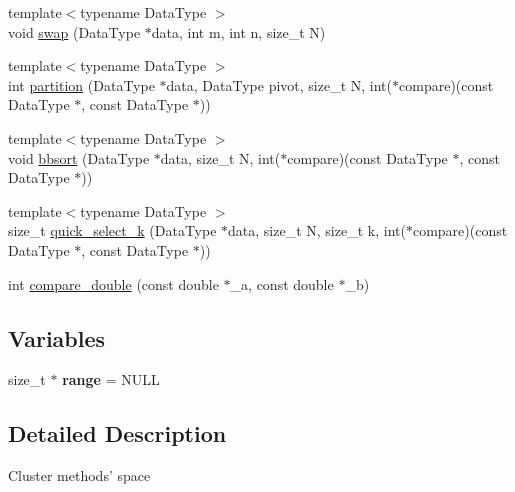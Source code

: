 \begin{DoxyCompactItemize}
\item 
{\footnotesize template$<$typename Data\-Type $>$ }\\void \hyperlink{namespaceSimpleCluster_aefa29bb93b88e6235d7a7c3be4181bf7}{swap} (Data\-Type $\ast$data, int m, int n, size\-\_\-t N)
\item 
{\footnotesize template$<$typename Data\-Type $>$ }\\int \hyperlink{namespaceSimpleCluster_adcef86d645170d3c6b1c7908866d755e}{partition} (Data\-Type $\ast$data, Data\-Type pivot, size\-\_\-t N, int($\ast$compare)(const Data\-Type $\ast$, const Data\-Type $\ast$))
\item 
{\footnotesize template$<$typename Data\-Type $>$ }\\void \hyperlink{namespaceSimpleCluster_acbdd21892a0a82f32c6d1851a7044f37}{bbsort} (Data\-Type $\ast$data, size\-\_\-t N, int($\ast$compare)(const Data\-Type $\ast$, const Data\-Type $\ast$))
\item 
{\footnotesize template$<$typename Data\-Type $>$ }\\size\-\_\-t \hyperlink{namespaceSimpleCluster_a3ff7d10652b776ae35a941228850d904}{quick\-\_\-select\-\_\-k} (Data\-Type $\ast$data, size\-\_\-t N, size\-\_\-t k, int($\ast$compare)(const Data\-Type $\ast$, const Data\-Type $\ast$))
\item 
int \hyperlink{namespaceSimpleCluster_a14624e6cca7beb136be3623222fb3acc}{compare\-\_\-double} (const double $\ast$\-\_\-a, const double $\ast$\-\_\-b)
\end{DoxyCompactItemize}
\subsection*{Variables}
\begin{DoxyCompactItemize}
\item 
\hypertarget{namespaceSimpleCluster_a8f5c11077c075f56a6d74d5a6a81c345}{size\-\_\-t $\ast$ {\bfseries range} = N\-U\-L\-L}\label{namespaceSimpleCluster_a8f5c11077c075f56a6d74d5a6a81c345}

\end{DoxyCompactItemize}


\subsection{Detailed Description}
Cluster methods' space 

